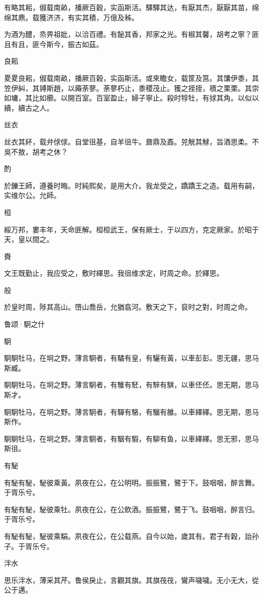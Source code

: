 有略其耜，俶载南畝，播厥百穀，实函斯活。驛驛其达，有厭其杰，厭厭其苗，绵绵其麃。载獲济济，有实其積，万億及秭。

为酒为醴，烝畀祖妣，以洽百禮。有飶其香，邦家之光。有椒其馨，胡考之寧？匪且有且，匪今斯今，振古如茲。

良耜

畟畟良耜，俶载南畝，播厥百穀，实函斯活。或來瞻女，载筐及筥。其馕伊黍，其笠伊糾，其镈斯趙，以薅荼蓼。荼蓼朽止，黍稷茂止。獲之挃挃，積之栗栗。其崇如墉，其比如櫛。以開百室。百室盈止，婦子寧止。殺时犉牡，有捄其角。以似以續，續古之人。

丝衣

丝衣其紑，载弁俅俅。自堂徂基，自羊徂牛。鼐鼎及鼒。兕觥其觩，旨酒思柔。不吳不敖，胡考之休？

酌

於鑠王師，遵養时晦。时純熙矣，是用大介。我龙受之，蹻蹻王之造。载用有嗣，实维尔公。允師。

桓

綏万邦，婁丰年，天命匪解。桓桓武王，保有厥士，于以四方，克定厥家。於昭于天，皇以間之。

賚

文王既勤止，我应受之，敷时繹思。我徂维求定，时周之命。於繹思。

般

於皇时周，陟其高山。嶞山喬岳，允猶翕河。敷天之下，裒时之對，时周之命。




鲁颂·駉之什


駉

駉駉牡马，在坰之野。薄言駉者，有驈有皇，有驪有黃，以車彭彭。思无疆，思马斯臧。

駉駉牡马，在坰之野。薄言駉者，有騅有駓，有騂有騏，以車伾伾。思无期，思马斯才。

駉駉牡马，在坰之野。薄言駉者，有驒有駱，有騮有雒。以車繹繹。思无期，思马斯作。

駉駉牡马，在坰之野。薄言駉者，有駰有騢，有駠有鱼，以車繹繹。思无邪，思马斯徂。

有駜

有駜有駜，駜彼乘黃。夙夜在公，在公明明。振振鷺，鷺于下。鼓咽咽，醉言舞。于胥乐兮。

有駜有駜，駜彼乘牡。夙夜在公，在公飲酒。振振鷺，鷺于飞。鼓咽咽，醉言归。于胥乐兮。

有駜有駜，駜彼乘駽。夙夜在公，在公载燕。自今以始，歲其有。君子有穀，詒孙子。于胥乐兮。

泮水

思乐泮水，薄采其芹。鲁侯戾止，言觀其旗。其旗茷茷，鸞声噦噦。无小无大，從公于邁。


